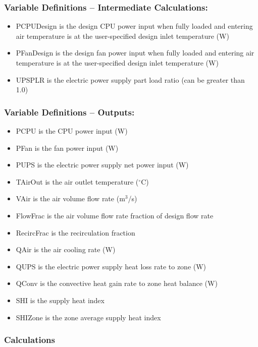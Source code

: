 \subsubsection{Variable Definitions -- Intermediate Calculations:}\label{variable-definitions-intermediate-calculations}

\begin{itemize}
\tightlist
\item
  PCPUDesign is the design CPU power input when fully loaded and entering air temperature is at the user-specified design inlet temperature (W)
\item
  PFanDesign is the design fan power input when fully loaded and entering air temperature is at the user-specified design inlet temperature (W)
\item
  UPSPLR is the electric power supply part load ratio (can be greater than 1.0)
\end{itemize}

\subsubsection{Variable Definitions -- Outputs:}\label{variable-definitions-outputs}

\begin{itemize}
\tightlist
\item
  PCPU is the CPU power input (W)
\item
  PFan is the fan power input (W)
\item
  PUPS is the electric power supply net power input (W)
\item
  TAirOut is the air outlet temperature (\(^{\circ}\)C)
\item
  VAir is the air volume flow rate (m\(^3\)/s)
\item
  FlowFrac is the air volume flow rate fraction of design flow rate
\item
  RecircFrac is the recirculation fraction
\item
  QAir is the air cooling rate (W)
\item
  QUPS is the electric power supply heat loss rate to zone (W)
\item
  QConv is the convective heat gain rate to zone heat balance (W)
\item
  SHI is the supply heat index
\item
  SHIZone is the zone average supply heat index
\end{itemize}

\subsubsection{Calculations}\label{calculations}

